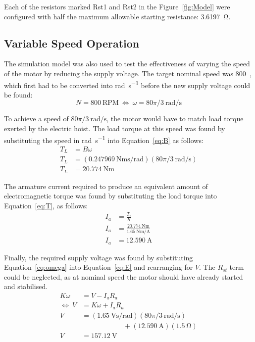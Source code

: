 \documentclass[a4paper,11pt,twocolumn]{article}
\newcommand{\V}{\si{\volt}\xspace}
\newcommand{\A}{\si{\ampere}\xspace}
\newcommand{\Ohm}{\si{\ohm}\xspace}
\newcommand{\Nm}{\si{\newton\metre}\xspace}
\newcommand{\rps}{\si{\radian\per\second}\xspace}
\newcommand{\Vspr}{\si{\volt\second\per\radian}\xspace}
\newcommand{\NmpA}{\si{\newton\metre\per\ampere}\xspace}
\newcommand{\Nmspr}{\si{\newton\metre\second\per\radian}\xspace}
\newcommand{\RPM}{\text{RPM}\xspace}
\begin{document}
Each of the resistors marked Rst1 and Rst2 in the Figure~\vref{fig:Model} were 
configured with half the maximum allowable starting resistance: 3.6197~\Ohm.

\subsection{Variable Speed Operation}

The simulation model was also used to test the effectiveness of varying the 
speed of the motor by reducing the supply voltage. The target nominal speed was 
800~\RPM, which first had to be converted into \rps before the new supply 
voltage could be found:
\begin{equation*}
    N = 800~\RPM~\Leftrightarrow~\omega = 80\pi/3~\rps
\end{equation*}

To achieve a speed of $80\pi/3~\rps$, the motor would have to match load torque 
exerted by the electric hoist. The load torque at this speed was found by 
substituting the speed in \rps into Equation~\vref{eq:B} as follows:
\begin{align*}
    T_L &= B\omega \\
    T_L &= (0.247969~\Nmspr)(80\pi/3~\rps) \\
    T_L &= 20.774~\Nm
\end{align*}

The armature current required to produce an equivalent amount of 
electromagnetic torque was found by substituting the load torque into 
Equation~\ref{eq:T}, as follows:
\begin{align*}
    I_a &= \frac{T_e}{K} \\
    I_a &= \frac{20.774~\Nm}{1.65~\NmpA} \\
    I_a &= 12.590~\A
\end{align*}

Finally, the required supply voltage was found by substituting 
Equation~\ref{eq:omega} into Equation~\ref{eq:E} and rearranging for $V$. The 
$R_{st}$ term could be neglected, as at nominal speed the motor should have 
already started and stabilised.
\begin{align*}
    K \omega &= V - I_a R_a \\
    \Leftrightarrow~V &= K \omega + I_a R_a \\
    V &= (1.65~\Vspr)(80\pi/3~\rps) \\
        &\hspace{6em}+ (12.590~\A)(1.5~\Ohm) \\
    V &= 157.12~\V
\end{align*}
\end{document}
